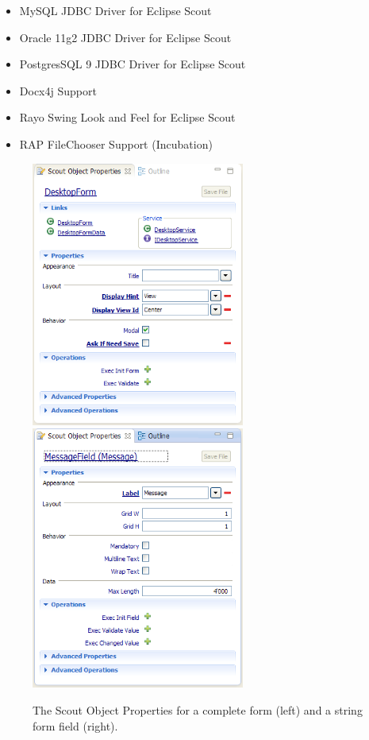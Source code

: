 \documentclass[a4paper,10pt,twoside]{book}
\begin{document}
\begin{itemize}
  \item MySQL JDBC Driver for Eclipse Scout
  \item Oracle 11g2 JDBC Driver for Eclipse Scout
  \item PostgresSQL 9 JDBC Driver for Eclipse Scout
  \item Docx4j Support
  \item Rayo Swing Look and Feel for Eclipse Scout
  \item RAP FileChooser Support (Incubation)
\end{itemize}

\begin{figure}
\includegraphics[width=7cm]{properties_form.png} \hspace{5mm}
\includegraphics[width=7cm]{properties_stringfield.png}
\caption{The Scout Object Properties for a complete form (left) and a string form field (right).}
\end{figure}
\end{document}
